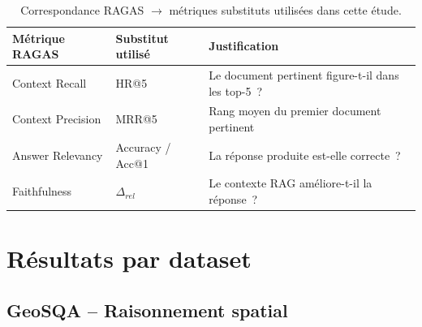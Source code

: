 \documentclass[12pt,a4paper]{article}
\begin{document}
\begin{table}[H]
\centering
\caption{Correspondance RAGAS $\rightarrow$ m\'etriques substituts utilis\'ees dans cette \'etude.}
\label{tab:ragas_sub}
\begin{tabular}{@{} l l l @{}}
\toprule
\textbf{M\'etrique RAGAS} & \textbf{Substitut utilis\'e} & \textbf{Justification} \\
\midrule
Context Recall    & HR@5  & Le document pertinent figure-t-il dans les top-5~? \\
\rowcolor{lightgray}
Context Precision & MRR@5 & Rang moyen du premier document pertinent \\
Answer Relevancy  & Accuracy / Acc@1 & La r\'eponse produite est-elle correcte~? \\
\rowcolor{lightgray}
Faithfulness      & $\Delta_{rel}$ & Le contexte RAG am\'eliore-t-il la r\'eponse~? \\
\bottomrule
\end{tabular}
\end{table}

\section{R\'esultats par dataset}
\label{sec:resultats}

\subsection{GeoSQA -- Raisonnement spatial}
\label{sec:geosqa}
\end{document}
